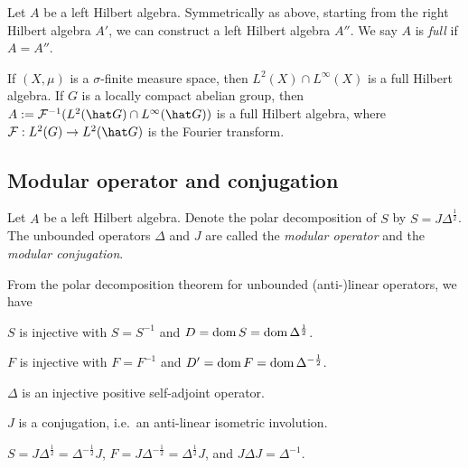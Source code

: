 \documentclass{../../small}
\begin{document}
\begin{defn}
Let $A$ be a left Hilbert algebra.
Symmetrically as above, starting from the right Hilbert algebra $A'$, we can construct a left Hilbert algebra $A''$.
We say $A$ is \emph{full} if $A=A''$.
\end{defn}

\begin{ex}
If $(X,\mu)$ is a $\sigma$-finite measure space, then $L^2(X)\cap L^\infty(X)$ is a full Hilbert algebra.
If $G$ is a locally compact abelian group, then $A:=\cF^{-1}(L^2(\hat G)\cap L^\infty(\hat G))$ is a full Hilbert algebra, where $\cF:L^2(G)\to L^2(\hat G)$ is the Fourier transform.
\end{ex}







\subsection{Modular operator and conjugation}

\begin{defn}
Let $A$ be a left Hilbert algebra.
Denote the polar decomposition of $S$ by $S=J\Delta^{\frac12}$.
The unbounded operators $\Delta$ and $J$ are called the \emph{modular operator} and the \emph{modular conjugation}.
\end{defn}

\begin{cor}
From the polar decomposition theorem for unbounded (anti-)linear operators, we have
\begin{parts}
\item $S$ is injective with $S=S^{-1}$ and $D=\operatorname{dom} S=\operatorname{dom}\Delta^{\frac12}$.
\item $F$ is injective with $F=F^{-1}$ and $D'=\operatorname{dom} F=\operatorname{dom}\Delta^{-\frac12}$.
\item $\Delta$ is an injective positive self-adjoint operator.
\item $J$ is a conjugation, i.e.~an anti-linear isometric involution.
\item $S=J\Delta^{\frac12}=\Delta^{-\frac12}J$, $F=J\Delta^{-\frac12}=\Delta^{\frac12}J$, and $J\Delta J=\Delta^{-1}$.
\end{parts}
\end{cor}
\end{document}

